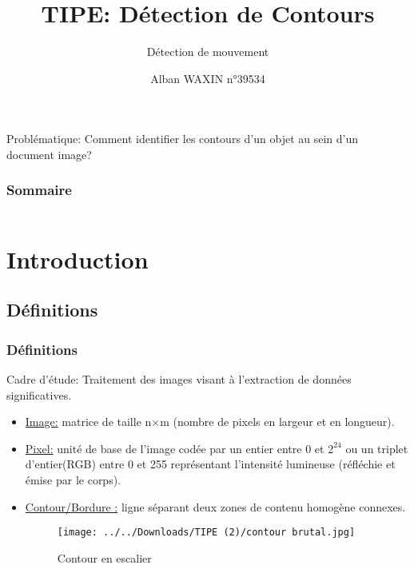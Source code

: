 \documentclass{beamer}
\title{TIPE: Détection de Contours}
\subtitle{Détection de mouvement}
\author{Alban WAXIN n°39534}
\date
\begin{document}
\frame{\titlepage}

\begin{frame}
\begin{block}
{Problématique:} Comment identifier les contours d'un objet au sein d'un document image?
\end{block}
\end{frame}

\begin{frame}
\frametitle{Sommaire}
\begin{columns}[t]
  \begin{column}{7.5cm}
  \tableofcontents[sections={1,2}]
  \end{column}
  \begin{column}{4.5cm}
  \tableofcontents[sections={3}]
  \end{column}
  \end{columns}
\setcounter{tocdepth}{2}
\end{frame}

\section{Introduction}
\subsection{Définitions}

\begin{frame}[fragile]
\frametitle{Définitions}

Cadre d'étude: Traitement des images visant à l'extraction de données significatives.

\begin{itemize}

\item \underline{Image:} matrice de taille n$\times$m (nombre de pixels en largeur et en longueur).

\item \underline{Pixel:} unité de base de l'image codée par un entier entre 0 et $2^{24}$ ou un triplet d'entier(RGB) entre 0 et 255
 représentant l'intensité lumineuse (réfléchie et émise par le corps).

\item \underline{Contour/Bordure :} ligne séparant deux zones de contenu homogène connexes.
\begin{figure}[h]
    \begin{minipage}[c]{.46\linewidth}
        \centering
        \texttt{[image: ../../Downloads/TIPE (2)/contour brutal.jpg]}
        \caption{Contour en escalier}
    \end{minipage}
\end{figure}
\end{itemize}
\end{frame}
\end{document}
